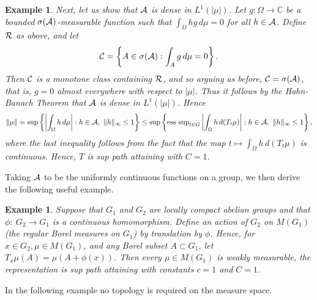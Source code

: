\documentclass[12pt]{article}
\newcommand{\C}{\mathbb C}
\newcommand{\A}{{\cal A}}
\newcommand{\cC}{{\cal C}}
\newcommand{\cR}{{\cal R}}
\newtheorem{ex}[defin]{Example}
\begin{document}
\begin{ex}
{Next, let us show that $\A$ is dense in $L^1(|\mu|)$.  Let
$g:\Omega\to\C$ be a bounded $\sigma(\A)$-measurable
function such that $\int_\Omega hg\,d\mu = 0$ for all
$ h \in \A$.  Define $\cR$ as above, and let
$$ \cC = \left\{ A \in \sigma(\A): \int_A g \, d\mu = 0 \right\} .$$
Then $\cC$ is a monotone class containing $\cR$, and so arguing as
before, $\cC = \sigma(\A)$, that is, $g = 0$ almost everywhere with respect
to $|\mu|$.  Thus it follows by the Hahn-Banach Theorem that
$\A$ is dense in $L^1(|\mu|)$.  Hence
$$ \|\mu\|
   =
   \sup\left\{\left|\int_\Omega h \, d\mu \right|: h \in \A,\ \|h\|_\infty \le 1\right\}
   \leq
   \sup\left\{{\rm ess\ sup}_{t\in G}
       \left| \int_\Omega h \, d(T_t\mu)\right| : h \in \A,\ \|h\|_\infty \le 1\right\} ,$$
where the last inequality follows from the fact that 
the map $t \mapsto \int_\Omega h \, d(T_t\mu)$ is continuous.
Hence, $T$ is sup path attaining with $C = 1$.
}
\label{exhypa1}
\end{ex}
Taking $\A$ to be the uniformly continuous functions on a group,
we then derive the following useful example.
\begin{ex}
{\rm
Suppose that $G_1$ and $G_2$ are locally compact abelian groups and that
 $\phi:\ G_2\rightarrow G_1$ is a continuous homomorphism.
Define an action of $G_2$ on $M(G_1)$ (the regular Borel measures
on $G_1$) by translation by $\phi$.
Hence, for $x\in G_2, \mu\in M(G_1)$, and any
Borel subset $A\subset G_1$, let $T_x\mu(A)=\mu(A+\phi(x))$.
Then every $\mu\in M(G_1)$ is weakly measurable, the
representation
is sup path attaining with constants $c = 1$ and $C = 1$.
}
\label{exhypa2}
\end{ex}
In the following example no topology is required on
the measure space.
\end{document}
